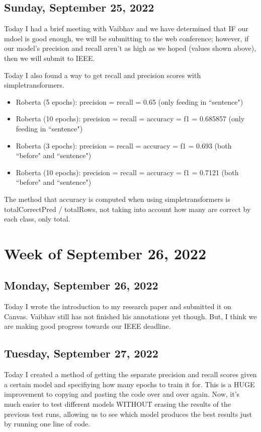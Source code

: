 \documentclass[11pt,letterpaper]{article}
\begin{document}
\subsection{Sunday, September 25, 2022}
Today I had a brief meeting with Vaibhav and we have determined that IF our mdoel is good enough, we will be submitting to the web conference; however, if our model's precision and recall aren't as high as we hoped (values shown above), then we will submit to IEEE.

Today I also found a way to get recall and precision scores with simpletransformers. 

\begin{itemize}
    \item Roberta (5 epochs): precision = recall = 0.65 (only feeding in ``sentence")
    \item Roberta (10 epochs): precision = recall = accuracy = f1 = 0.685857 (only feeding in ``sentence")
    \item Roberta (3 epochs): precision = recall = accuracy = f1 = 0.693 (both ``before" and ``sentence")
    \item Roberta (10 epochs): precision = recall = accuracy = f1 = 0.7121 (both ``before" and ``sentence")
\end{itemize}

The method that accuracy is computed when using simpletransformers is totalCorrectPred / totalRows, not taking into account how many are correct by each class, only total.

\section{Week of September 26, 2022}
\subsection{Monday, September 26, 2022}
Today I wrote the introduction to my research paper and submitted it on Canvas. Vaibhav still has not finished his annotations yet though. But, I think we are making good progress towards our IEEE deadline.

\subsection{Tuesday, September 27, 2022}
Today I created a method of getting the separate precision and recall scores given a certain model and specifiying how many epochs to train it for. This is a HUGE improvement to copying and pasting the code over and over again. Now, it's much easier to test different models WITHOUT erasing the results of the previous test runs, allowing us to see which model produces the best results just by running one line of code. 
\end{document}
